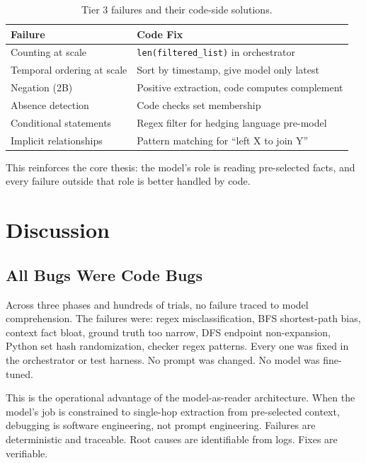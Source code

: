 \documentclass[11pt,a4paper]{article}
\begin{document}
\begin{table}[h]
\centering
\caption{Tier 3 failures and their code-side solutions.}
\label{tab:codefixes}
\begin{tabular}{@{}ll@{}}
\toprule
Failure & Code Fix \\
\midrule
Counting at scale & \texttt{len(filtered\_list)} in orchestrator \\
Temporal ordering at scale & Sort by timestamp, give model only latest \\
Negation (2B) & Positive extraction, code computes complement \\
Absence detection & Code checks set membership \\
Conditional statements & Regex filter for hedging language pre-model \\
Implicit relationships & Pattern matching for ``left X to join Y'' \\
\bottomrule
\end{tabular}
\end{table}

This reinforces the core thesis: the model's role is reading pre-selected facts, and every failure outside that role is better handled by code.

\section{Discussion}
\label{sec:discussion}

\subsection{All Bugs Were Code Bugs}

Across three phases and hundreds of trials, no failure traced to model comprehension. The failures were: regex misclassification, BFS shortest-path bias, context fact bloat, ground truth too narrow, DFS endpoint non-expansion, Python set hash randomization, checker regex patterns. Every one was fixed in the orchestrator or test harness. No prompt was changed. No model was fine-tuned.

This is the operational advantage of the model-as-reader architecture. When the model's job is constrained to single-hop extraction from pre-selected context, debugging is software engineering, not prompt engineering. Failures are deterministic and traceable. Root causes are identifiable from logs. Fixes are verifiable.
\end{document}
